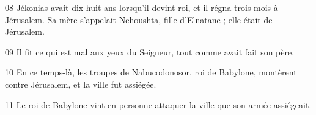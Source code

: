 08 Jékonias avait dix-huit ans lorsqu’il devint roi, et il régna trois mois à Jérusalem. Sa mère s’appelait Nehoushta, fille d’Elnatane ; elle était de Jérusalem.

09 Il fit ce qui est mal aux yeux du Seigneur, tout comme avait fait son père.

10 En ce temps-là, les troupes de Nabucodonosor, roi de Babylone, montèrent contre Jérusalem, et la ville fut assiégée.

11 Le roi de Babylone vint en personne attaquer la ville que son armée assiégeait.

